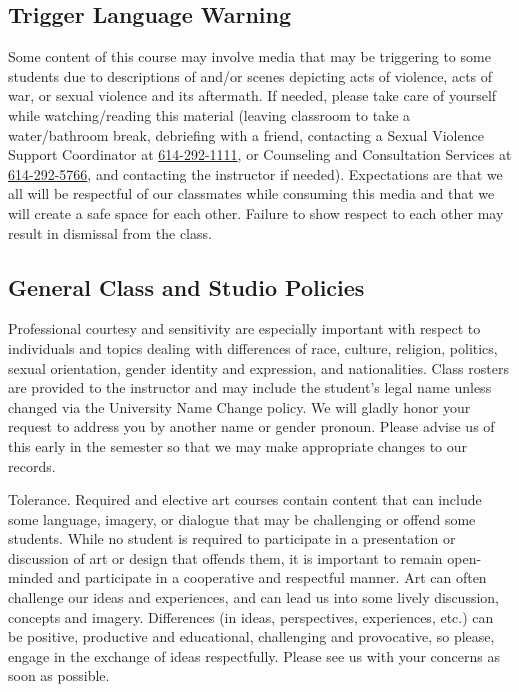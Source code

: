 \subsection{Trigger Language Warning}

Some content of this course may involve media that may be triggering to some students due to descriptions of and/or scenes depicting acts of violence, acts of war, or sexual violence and its aftermath. If needed, please take care of yourself while watching/reading this material (leaving classroom to take a water/bathroom break, debriefing with a friend, contacting a Sexual Violence Support Coordinator at \href{tel:6142921111}{614-292-1111}, or Counseling and Consultation Services at \href{tel:6142925766}{614-292-5766}, and contacting the instructor if needed). Expectations are that we all will be respectful of our classmates while consuming this media and that we will create a safe space for each other. Failure to show respect to each other may result in dismissal from the class.

\subsection{General Class and Studio Policies}

Professional courtesy and sensitivity are especially important with respect to individuals and topics dealing with differences of race, culture, religion, politics, sexual orientation, gender identity and expression, and nationalities. Class rosters are provided to the instructor and may include the student's legal name unless changed via the University Name Change policy. We will gladly honor your request to address you by another name or gender pronoun. Please advise us of this early in the semester so that we may make appropriate changes to our records.

Tolerance. Required and elective art courses contain content that can include some language, imagery, or dialogue that may be challenging or offend some students. While no student is required to participate in a presentation or discussion of art or design that offends them, it is important to remain open-minded and participate in a cooperative and respectful manner. Art can often challenge our ideas and experiences, and can lead us into some lively discussion, concepts and imagery. Differences (in ideas, perspectives, experiences, etc.) can be positive, productive and educational, challenging and provocative, so please, engage in the exchange of ideas respectfully. Please see us with your concerns as soon as possible.

